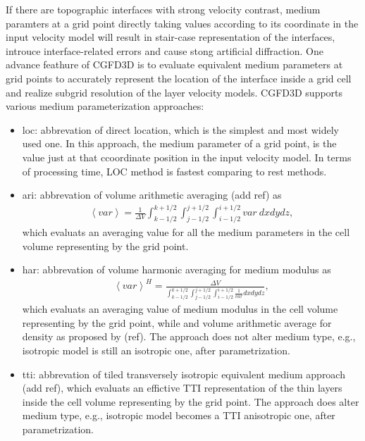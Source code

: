 If there are topographic interfaces with strong velocity contrast, 
medium paramters at a grid point directly taking values according to its coordinate in the input velocity model
 will result in stair-case representation of the interfaces, introuce interface-related errors and cause stong artificial diffraction.
One advance feathure of CGFD3D is to evaluate equivalent medium parameters at grid points 
to accurately represent the location of the interface inside a grid cell 
and realize subgrid resolution of the layer velocity models.
CGFD3D supports various medium parameterization approaches:
\begin{itemize}
\item loc: abbrevation of direct location, which is the simplest and most widely used one. 
      In this approach, the medium parameter of a grid point,
      is the value just at that ccoordinate position
      in the input velocity model. In terms of processing time,
      LOC method is fastest comparing to rest methods.
\item ari: abbrevation of volume arithmetic averaging (add ref) as
  \begin{align}
    \left<var\right> = \frac{1}{\Delta V} 
            \int_{k-1/2}^{k+1/2} \int_{j-1/2}^{j+1/2} \int_{i-1/2}^{i+1/2} var~dx dy dz,
  \end{align}
  which evaluats an averaging value for all the medium parameters
    in the cell volume representing by the grid point.
\item har: abbrevation of volume harmonic averaging for medium modulus as 
  \begin{align}
    \left<var\right>^H = \frac{\Delta V}
      {\int_{k-1/2}^{k+1/2} \int_{j-1/2}^{j+1/2} \int_{i-1/2}^{i+1/2} \frac{1}{var} dx dy dz},
  \end{align}
  which evaluats an averaging value of medium modulus in the cell volume representing by the grid point,
  while and volume arithmetic average for density as proposed by (ref).
  The approach does not alter medium type,
    e.g., isotropic model is still an isotropic one, after parametrization.
\item tti: abbrevation of tiled transversely isotropic equivalent medium approach (add ref), 
        which evaluats an effictive TTI representation of the thin layers inside the cell volume representing by the grid point.
        The approach does alter medium type, e.g., isotropic model becomes a TTI anisotropic one, after parametrization.
\end{itemize}


